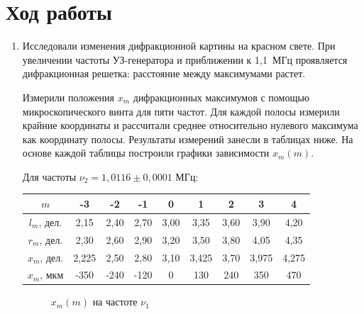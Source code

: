 \documentclass[a4paper,12pt]{article} %
\begin{document}
	\section{Ход работы}
	\begin{enumerate}
	    \item Исследовали изменения дифракционной картины на красном свете. При увеличении частоты УЗ-генератора и приближении к 1,1~МГц проявляется дифракционная решетка: расстояние между максимумами растет.
	    
	    Измерили положения $ x_m $ дифракционных максимумов с помощью микроскопического винта для пяти частот. Для каждой полосы измерили крайние координаты и рассчитали среднее относительно нулевого максимума как координату полосы. Результаты измерений занесли в таблицах ниже. На основе каждой таблицы построили графики зависимости $ x_m (m) $.
	    
	    Для частоты $\nu_2=1{,}0116\pm 0{,}0001$ МГц:
	    \begin{center}
	    \begin{tabular}{|c|c|c|c|c|c|c|c|c|}
            \hline
            $m$ & -3 & -2 & -1 & 0 & 1 & 2 & 3 & 4 \\ \hline
            $l_m$, дел. & 2,15 & 2,40 & 2,70 & 3,00 & 3,35 & 3,60 & 3,90 & 4,20 \\ \hline
            $r_m$, дел. & 2,30 & 2,60 & 2,90 & 3,20 & 3,50 & 3,80 & 4,05 & 4,35 \\ \hline
            $x_m$, дел. & 2,225 & 2,50 & 2,80 & 3,10 & 3,425 & 3,70 & 3,975 & 4,275 \\ \hline
            $x_m$, мкм & -350 & -240 & -120 & 0 & 130 & 240 & 350 & 470 \\ \hline
        \end{tabular}
	    \end{center}
	\begin{figure}[!htb] \centering
		\caption{$x_m(m)$ на частоте $\nu_1$}
	\end{figure}
	

\end{enumerate}
\end{document}
